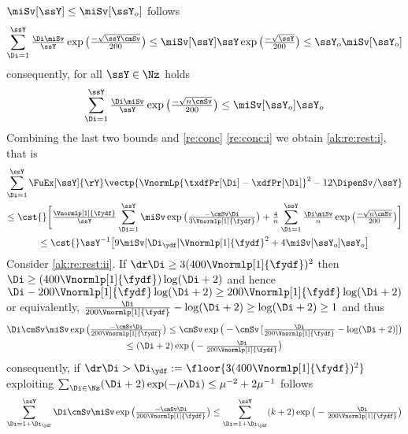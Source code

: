 \begin{pro}
 $\miSv[\ssY]\leq\miSv[\ssY_{o}]$ follows
\begin{equation*}
   \sum_{\Di=1}^{\ssY}\tfrac{\Di\miSv}{\ssY}\exp\big(\tfrac{-\sqrt{\ssY\cmSv}}{200}\big)\leq 
    \miSv[\ssY]\ssY\exp\big(\tfrac{-\sqrt{\ssY}}{200}\big)\leq\ssY_{o}\miSv[\ssY_{o}]
  \end{equation*}
 consequently, for all $\ssY\in\Nz$ holds
 \begin{displaymath}
 \sum_{\Di=1}^{\ssY}\tfrac{\Di\miSv}{\ssY}\exp\big(\tfrac{-\sqrt{n\cmSv}}{200}\big)\leq \miSv[\ssY_{o}]\ssY_{o}
\end{displaymath}
Combining the last two bounds and \cref{re:conc} \ref{re:conc:i}  we obtain \ref{ak:re:rest:i}, that is 
\begin{multline*}
\sum_{\Di=1}^{\ssY}\FuEx[\ssY]{\rY}\vectp{\VnormLp{\txdfPr[\Di]-\xdfPr[\Di]}^2-12\DipenSv/\ssY}\\\hfill\leq \cst{}\bigg[\tfrac{\Vnormlp[1]{\fydf}}{\ssY}\sum_{\Di=1}^{\ssY}
\miSv\exp\big(\tfrac{-\cmSv\Di}{3\Vnormlp[1]{\fydf}}\big)+\tfrac{4}{n}\sum_{\Di=1}^{\ssY}\tfrac{\Di\miSv}{n}\exp\big(\tfrac{-\sqrt{n\cmSv}}{200}\big)
\bigg]\\\leq \cst{}\ssY^{-1}\big[9\miSv[\Di_{\ydf}]{\Vnormlp[1]{\fydf}^2}+4 \miSv[\ssY_{o}]\ssY_{o}\big]
\end{multline*}
Consider  \ref{ak:re:rest:ii}. If   $\dr\Di\geq 3({400\Vnormlp[1]{\fydf}})^2$ then 
$\Di\geq  ({400\Vnormlp[1]{\fydf}})\log(\Di+2)$ and
hence
$\Di-{200\Vnormlp[1]{\fydf}}\log(\Di+2)\geq{200\Vnormlp[1]{\fydf}}\log(\Di+2)$
or equivalently,
$\tfrac{\Di}{200\Vnormlp[1]{\fydf}}-\log(\Di+2)\geq\log(\Di+2)\geq1$
and thus
\begin{multline*}
\Di\cmSv\miSv\exp\big(\tfrac{-\cmSv\Di}{200\Vnormlp[1]{\fydf}}\big)\leq
\cmSv\exp\big(-\cmSv\,[\tfrac{\Di}{200\Vnormlp[1]{\fydf}}-\log(\Di+2)]\big)\\\leq
(\Di+2)\exp\big(-\tfrac{\Di}{200\Vnormlp[1]{\fydf}}\big)%
\end{multline*}
consequently, if $\dr\Di>\Di_{\ydf}:=\floor{3({400\Vnormlp[1]{\fydf}})^2}$ exploiting $\sum_{\Di\in\Nz}(\Di+2)\exp(-\mu\Di)\leq \mu^{-2}+ 2\mu^{-1}$
follows
\begin{multline*}
\sum_{\Di=1+\Di_{\ydf}}^{\ssY}\Di\cmSv\miSv\exp\big(\tfrac{-\cmSv\Di}{200\Vnormlp[1]{\fydf}}\big)\leq
\sum_{\Di=1+\Di_{\ydf}}^{\ssY}(k+2)\exp\big(-\tfrac{\Di}{200\Vnormlp[1]{\fydf}}\big)

\end{multline*}
\end{pro}
